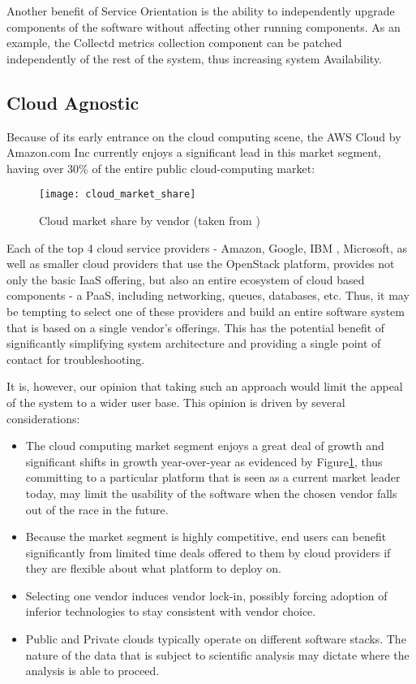 Another benefit of Service Orientation is the ability to independently upgrade components of the software without affecting other running components. As an example, the Collectd metrics collection component can be patched independently of the rest of the system, thus increasing system Availability.

\subsection {Cloud Agnostic}

Because of its early entrance on the cloud computing scene, the AWS Cloud by Amazon.com Inc currently enjoys a significant lead in this market segment, having over 30\% of the entire public cloud-computing market:

\begin{figure}[h]
\texttt{[image: cloud\_market\_share]}
\centering
\caption {Cloud market share by vendor (taken from \autocite{cloudproviders})}
\label{fig:cloud_market_share}
\end{figure}

Each of the top 4 cloud service providers - Amazon, Google, IBM , Microsoft, as well as smaller cloud providers that use the OpenStack platform, provides not only the basic IaaS offering, but also an entire ecosystem of cloud based components - a PaaS, including networking, queues, databases, etc. Thus, it may be tempting to select one of these providers and build an entire software system that is based on a single vendor's offerings. This has the potential benefit of significantly simplifying system architecture and providing a single point of contact for troubleshooting.

It is, however, our opinion that taking such an approach would limit the appeal of the system to a wider user base. This opinion is driven by several considerations:

\begin{itemize}
\item The cloud computing market segment enjoys a great deal of growth and significant shifts in growth year-over-year as evidenced by Figure\ref{fig:cloud_market_share}, thus committing to a particular platform that is seen as a current market leader today, may limit the usability of the software when the chosen vendor falls out of the race in the future.
\item Because the market segment is highly competitive, end users can benefit significantly from limited time deals offered to them by cloud providers if they are flexible about what platform to deploy on.
\item Selecting one vendor induces vendor lock-in, possibly forcing adoption of inferior technologies to stay consistent with vendor choice.
\item Public and Private clouds typically operate on different software stacks. The nature of the data that is subject to scientific analysis may dictate where the analysis is able to proceed. 
\end{itemize}

